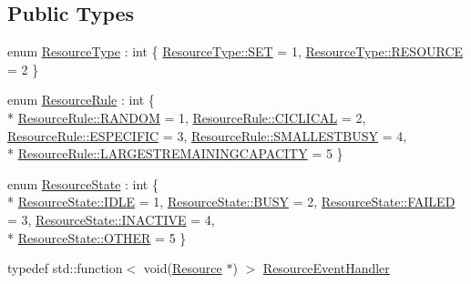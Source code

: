 \subsection*{Public Types}
\begin{DoxyCompactItemize}
\item 
enum \hyperlink{class_resource_aa607c54bf52a9c36b331888ee936a52c}{Resource\+Type} \+: int \{ \hyperlink{class_resource_aa607c54bf52a9c36b331888ee936a52ca8c52684db8f49511e9b44471716bf164}{Resource\+Type\+::\+S\+ET} = 1, 
\hyperlink{class_resource_aa607c54bf52a9c36b331888ee936a52ca4f49da9035f276c0947466eb7c42249a}{Resource\+Type\+::\+R\+E\+S\+O\+U\+R\+CE} = 2
 \}
\item 
enum \hyperlink{class_resource_afa28dce79d48cbaf6b10f899f2dedfb7}{Resource\+Rule} \+: int \{ \\*
\hyperlink{class_resource_afa28dce79d48cbaf6b10f899f2dedfb7a170e02e86972c2be8559884cc3c12254}{Resource\+Rule\+::\+R\+A\+N\+D\+OM} = 1, 
\hyperlink{class_resource_afa28dce79d48cbaf6b10f899f2dedfb7a799276ee6dde6c0ae5c9fb1cacf14531}{Resource\+Rule\+::\+C\+I\+C\+L\+I\+C\+AL} = 2, 
\hyperlink{class_resource_afa28dce79d48cbaf6b10f899f2dedfb7af3445810d590ed87cd13c95d4ed17d0a}{Resource\+Rule\+::\+E\+S\+P\+E\+C\+I\+F\+IC} = 3, 
\hyperlink{class_resource_afa28dce79d48cbaf6b10f899f2dedfb7a3a3df6d137a401694ba70b55e6ff7305}{Resource\+Rule\+::\+S\+M\+A\+L\+L\+E\+S\+T\+B\+U\+SY} = 4, 
\\*
\hyperlink{class_resource_afa28dce79d48cbaf6b10f899f2dedfb7a523a069c516b904643398d8457bf5053}{Resource\+Rule\+::\+L\+A\+R\+G\+E\+S\+T\+R\+E\+M\+A\+I\+N\+I\+N\+G\+C\+A\+P\+A\+C\+I\+TY} = 5
 \}
\item 
enum \hyperlink{class_resource_af2224610b59962683d3cafbdac10621a}{Resource\+State} \+: int \{ \\*
\hyperlink{class_resource_af2224610b59962683d3cafbdac10621aaa5daf7f2ebbba4975d61dab1c40188c7}{Resource\+State\+::\+I\+D\+LE} = 1, 
\hyperlink{class_resource_af2224610b59962683d3cafbdac10621aa802706a9238e2928077f97736854bad4}{Resource\+State\+::\+B\+U\+SY} = 2, 
\hyperlink{class_resource_af2224610b59962683d3cafbdac10621aab9e14d9b2886bcff408b85aefa780419}{Resource\+State\+::\+F\+A\+I\+L\+ED} = 3, 
\hyperlink{class_resource_af2224610b59962683d3cafbdac10621aa6b273343c454f9c53dcfc9c4ccf171d2}{Resource\+State\+::\+I\+N\+A\+C\+T\+I\+VE} = 4, 
\\*
\hyperlink{class_resource_af2224610b59962683d3cafbdac10621aa03570470bad94692ce93e32700d2e1cb}{Resource\+State\+::\+O\+T\+H\+ER} = 5
 \}
\item 
typedef std\+::function$<$ void(\hyperlink{class_resource}{Resource} $\ast$) $>$ \hyperlink{class_resource_a3a8c56cef21f639c17ccf95b8b6782e6}{Resource\+Event\+Handler}
\end{DoxyCompactItemize}
